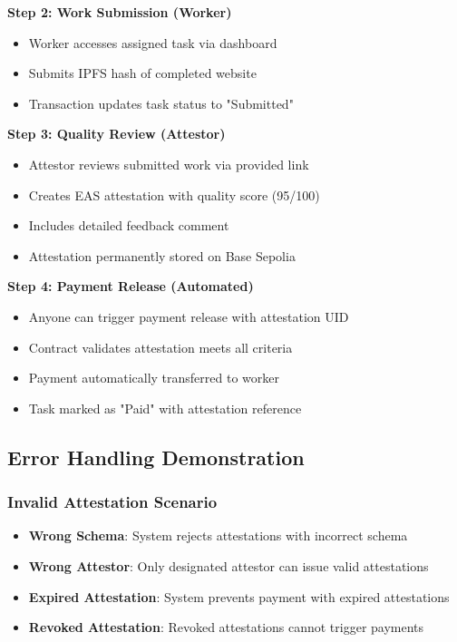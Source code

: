 \documentclass[12pt,a4paper]{article}
\begin{document}
\textbf{Step 2: Work Submission (Worker)}
\begin{itemize}
    \item Worker accesses assigned task via dashboard
    \item Submits IPFS hash of completed website
    \item Transaction updates task status to "Submitted"
\end{itemize}

\textbf{Step 3: Quality Review (Attestor)}
\begin{itemize}
    \item Attestor reviews submitted work via provided link
    \item Creates EAS attestation with quality score (95/100)
    \item Includes detailed feedback comment
    \item Attestation permanently stored on Base Sepolia
\end{itemize}

\textbf{Step 4: Payment Release (Automated)}
\begin{itemize}
    \item Anyone can trigger payment release with attestation UID
    \item Contract validates attestation meets all criteria
    \item Payment automatically transferred to worker
    \item Task marked as "Paid" with attestation reference
\end{itemize}

\subsection{Error Handling Demonstration}

\subsubsection{Invalid Attestation Scenario}
\begin{itemize}
    \item \textbf{Wrong Schema}: System rejects attestations with incorrect schema
    \item \textbf{Wrong Attestor}: Only designated attestor can issue valid attestations
    \item \textbf{Expired Attestation}: System prevents payment with expired attestations
    \item \textbf{Revoked Attestation}: Revoked attestations cannot trigger payments
\end{itemize}
\end{document}
